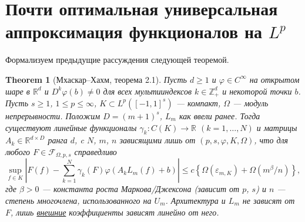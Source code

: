 \documentclass[12pt]{article}
\newtheorem{theorem}{Theorem}
\begin{document}
\section{Почти оптимальная универсальная аппроксимация функционалов на \(L^p\)}
Формализуем предыдущие рассуждения следующей теоремой.
\begin{theorem}[Мхаскар--Хахм, теорема 2.1]
  Пусть \(d \ge 1\) и \(\varphi \in C^\infty\) на открытом шаре в \(\mathbb{R}^d\) и \(D^k \varphi(b) \neq 0\) для всех мультииндексов \(k \in \mathbb{Z}_+^d\) и некоторой точки \(b\).
  Пусть \(s \ge 1\), \(1 \le p \le \infty\), \(K \subset L^p([-1,1]^s)\) --- компакт, \(\Omega\) --- модуль непрерывности.
  Положим \(D = (m+1)^s\), \(L_m\) как ввели ранее.
  Тогда существуют линейные функционалы \(\gamma_k\colon C(K) \to \mathbb{R}\) \((k = 1,\dots,N)\) и матрицы \(A_k \in \mathbb{R}^{d \times D}\) ранга \(d\), c \(N\), \(m\), \(n\) зависящими лишь от \((p,s,\varphi,K,\Omega)\), что для любого \(F \in \mathcal{F}_{\Omega,p,s}\) справедливо
  \[\sup_{f \in K} \left| F(f) - \sum_{k=1}^{N} \gamma_k(F) \varphi(A_k L_m(f) + b) \right| \leq c \left\{ \Omega(\varepsilon_{m,K}) + \Omega(m^\beta / n) \right\},\]
  где \(\beta > 0\) --- константа роста Маркова/Джексона (зависит от \(p\), \(s\)) и \(n\) --- степень многочлена, использованного на \(U_m\).
  Архитектура и \(L_m\) не зависят от \(F\), лишь \underline{внешние} коэффициенты зависят линейно от него.
\end{theorem}
\end{document}
